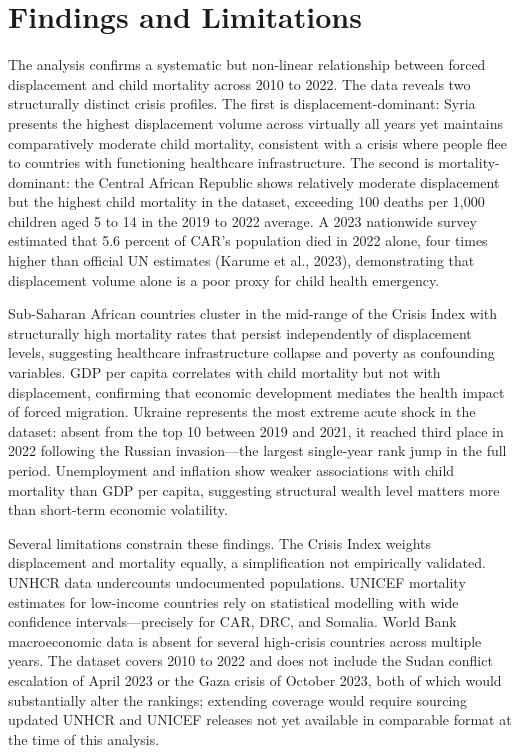 \documentclass{article}
\begin{document}
\section{Findings and Limitations}

The analysis confirms a systematic but non-linear relationship between forced displacement and child mortality across 2010 to 2022. The data reveals two structurally distinct crisis profiles. The first is displacement-dominant: Syria presents the highest displacement volume across virtually all years yet maintains comparatively moderate child mortality, consistent with a crisis where people flee to countries with functioning healthcare infrastructure. The second is mortality-dominant: the Central African Republic shows relatively moderate displacement but the highest child mortality in the dataset, exceeding 100 deaths per 1{,}000 children aged 5 to 14 in the 2019 to 2022 average. A 2023 nationwide survey estimated that 5.6 percent of CAR's population died in 2022 alone, four times higher than official UN estimates (Karume et al., 2023), demonstrating that displacement volume alone is a poor proxy for child health emergency.

Sub-Saharan African countries cluster in the mid-range of the Crisis Index with structurally high mortality rates that persist independently of displacement levels, suggesting healthcare infrastructure collapse and poverty as confounding variables. GDP per capita correlates with child mortality but not with displacement, confirming that economic development mediates the health impact of forced migration. Ukraine represents the most extreme acute shock in the dataset: absent from the top 10 between 2019 and 2021, it reached third place in 2022 following the Russian invasion---the largest single-year rank jump in the full period. Unemployment and inflation show weaker associations with child mortality than GDP per capita, suggesting structural wealth level matters more than short-term economic volatility.

Several limitations constrain these findings. The Crisis Index weights displacement and mortality equally, a simplification not empirically validated. UNHCR data undercounts undocumented populations. UNICEF mortality estimates for low-income countries rely on statistical modelling with wide confidence intervals---precisely for CAR, DRC, and Somalia. World Bank macroeconomic data is absent for several high-crisis countries across multiple years. The dataset covers 2010 to 2022 and does not include the Sudan conflict escalation of April 2023 or the Gaza crisis of October 2023, both of which would substantially alter the rankings; extending coverage would require sourcing updated UNHCR and UNICEF releases not yet available in comparable format at the time of this analysis.
\end{document}
